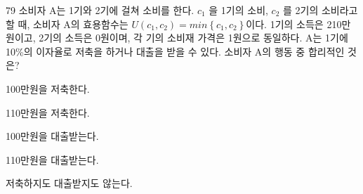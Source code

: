 \begin{question}{79}
소비자 A는 1기와 2기에 걸쳐 소비를 한다. $c_{ 1 }$ 을 1기의 소비, $c_{ 2 }$ 를 2기의 소비라고 할 때, 소비자 A의 효용함수는 $U (c_{ 1 } , c_{ 2 } )=min \left \{ c_{ 1 } , c_{ 2 } \right \}$이다. 1기의 소득은 210만원이고, 2기의 소득은 0원이며, 각 기의 소비재 가격은 1원으로 동일하다. A는 1기에 10\%의 이자율로 저축을 하거나 대출을 받을 수 있다. 소비자 A의 행동 중 합리적인 것은?
\begin{choices}
  \item 100만원을 저축한다.
  \item 110만원을 저축한다.
  \item 100만원을 대출받는다.
  \item 110만원을 대출받는다.
  \item 저축하지도 대출받지도 않는다.
\end{choices}
\end{question}
